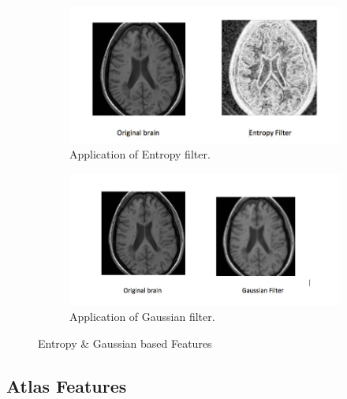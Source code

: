 \documentclass{article} %
\begin{document}
\begin{figure}[h]
\centering
\begin{subfigure}[b]{.4\linewidth}
\centering
\includegraphics[scale=0.2]{entropy.jpg}
\caption{ Application of Entropy filter.}
\end{subfigure}
\begin{subfigure}[b]{.4\linewidth}
\centering
\includegraphics[scale=0.2]{gauss.jpg}
\caption{Application of Gaussian filter.}
\end{subfigure}
\caption{Entropy \& Gaussian based Features}
\end{figure}


\subsection{Atlas Features}
\end{document}
